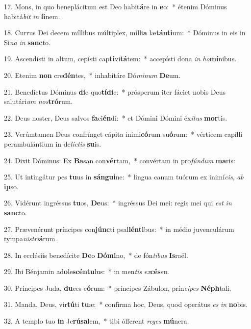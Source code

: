 17. Mons, in quo beneplácitum est Deo habi\textbf{tá}re in \textbf{e}o:~*  étenim Dóminus habitá\textit{bit} \textit{in} \textbf{fi}nem.\

18. Currus Dei decem míllibus múltiplex, mílli\textbf{a} læ\textbf{tán}\textbf{ti}um:~*  Dóminus in eis in Si\textit{na} \textit{in} \textbf{sanc}to.\

19. Ascendísti in altum, cepísti cap\textbf{ti}vi\textbf{tá}tem:~*  accepísti dona \textit{in} \textit{ho}\textbf{mí}nibus.\

20. Etenim \textbf{non} cre\textbf{dén}tes,~*  inhabitáre Dó\textit{mi}\textit{num} \textbf{De}um.\

21. Benedíctus Dóminus \textbf{di}e quo\textbf{tí}\textbf{di}e:~*  prósperum iter fáciet nobis Deus salutári\textit{um} \textit{nos}\textbf{tró}rum.\

22. Deus noster, Deus salvos \textbf{fa}ci\textbf{én}di:~*  et Dómini Dómini éx\textit{i}\textit{tus} \textbf{mor}tis.\

23. Verúmtamen Deus confrínget cápita inimi\textbf{có}rum su\textbf{ó}rum:~*  vérticem capílli perambulántium in de\textit{líc}\textit{tis} \textbf{su}is.\

24. Dixit Dóminus: Ex \textbf{Ba}san con\textbf{vér}tam,~*  convértam in pro\textit{fún}\textit{dum} \textbf{ma}ris:\

25. Ut intingátur pes \textbf{tu}us in \textbf{sán}\textbf{gui}ne:~*  lingua canum tuórum ex inimí\textit{cis}, \textit{ab} \textbf{ip}so.\

26. Vidérunt ingréssus \textbf{tu}os, \textbf{De}us:~*  ingréssus Dei mei: regis mei qui \textit{est} \textit{in} \textbf{sanc}to.\

27. Prævenérunt príncipes con\textbf{júnc}ti psal\textbf{lén}\textbf{ti}bus:~*  in médio juvenculárum tympa\textit{nis}\textit{tri}\textbf{á}rum.\

28. In ecclésiis benedícite \textbf{De}o \textbf{Dó}\textbf{mi}no,~*  de fón\textit{ti}\textit{bus} \textbf{Is}raël.\

29. Ibi Bénjamin ad\textbf{o}le\textbf{scén}\textbf{tu}lus:~*  in men\textit{tis} \textit{ex}\textbf{cés}su.\

30. Príncipes Juda, \textbf{du}ces e\textbf{ó}rum:~*  príncipes Zábulon, prín\textit{ci}\textit{pes} \textbf{Néph}tali.\

31. Manda, Deus, vir\textbf{tú}ti \textbf{tu}æ:~*  confírma hoc, Deus, quod operátus \textit{es} \textit{in} \textbf{no}bis.\

32. A templo tuo \textbf{in} Je\textbf{rú}\textbf{sa}lem,~*  tibi ófferent \textit{re}\textit{ges} \textbf{mú}nera.\

